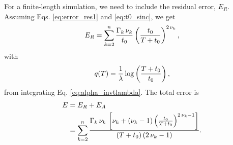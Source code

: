 \documentclass[reprint, floatfix]{revtex4-1}
\newcommand{\note}[1]{{\color{DarkGreen}\footnotesize \textsc{Note.} #1}}
\newcommand{\Err}{E}
\begin{document}
For a finite-length simulation,
we need to include the residual error, $\Err_R$.
%
Assuming Eqs. \eqref{eq:error_res1} and \eqref{eq:t0_sinc},
we get
%
\begin{equation}
\Err_R
=
\sum_{k = 2}^n
  \frac{ \Gamma_k \, \nu_k }
       {        t_0   }
  \left(
      \frac{   t_0   }
           { T + t_0 }
   \right)^{ 2 \, \nu_k },
\notag
\end{equation}
%
with
%
\begin{equation}
  q(T)
  =
  \frac{ 1 } { \lambda }
  \log\left(
    \frac{ T + t_0 } { t_0 }
  \right)
  ,
\notag
\end{equation}
%
from integrating Eq. \eqref{eq:alpha_invtlambda}.
%
%
The total error is
%
\begin{align}
\Err
&=
\Err_R + \Err_A
\notag
\\
&=
\sum_{ k = 2 }^n
  \frac
  {
    \Gamma_k \, \nu_k \,
    \left[
      \nu_k
      +
      (\nu_k - 1)
      \left(
        \frac{ t_0 } { T + t_0 }
      \right)^{ 2 \, \nu_k - 1 }
    \right]
  }
  {
    (T + t_0) \, (2 \, \nu_k - 1)
  }
  .
\label{eq:error_invt}
\end{align}
%

\end{document}
